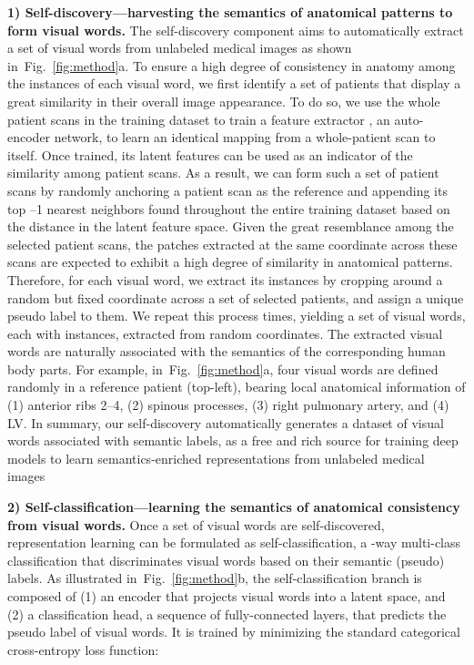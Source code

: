 \documentclass[journal,twoside,web]{ieeecolor}
\def\figurename{Fig.}
\begin{document}
\smallskip
\noindent\textbf{1) Self-discovery---harvesting the semantics of anatomical patterns to form visual words.}
\label{sec:vw_discovery}
The self-discovery component aims to automatically extract a set of  visual words from unlabeled medical images as shown in~\figurename~\ref{fig:method}a. To ensure a high degree of consistency in anatomy among the instances of each visual word, we first identify a set of  patients that display a great similarity in their overall image appearance. To do so, we use the whole patient scans in the training dataset to train a feature extractor , an auto-encoder network, to learn an identical mapping from a whole-patient scan to itself. Once trained, its latent features can be used as an indicator of the similarity among patient scans. As a result, we can form such a set of  patient scans by randomly anchoring a patient scan as the reference and appending its top --1 nearest neighbors found throughout the entire training dataset based on the  distance in the latent feature space. Given the great resemblance among the selected  patient scans, the patches extracted at the same coordinate across these  scans are expected to exhibit a high degree of similarity in anatomical patterns. Therefore, for each visual word, we extract its  instances by cropping around a random but fixed coordinate across a set of selected  patients, and assign a unique pseudo label to them. We repeat this process  times, yielding a set of  visual words, each with  instances, extracted from  random coordinates. The extracted visual words are naturally associated with the semantics of the corresponding human body parts. For example, in~\figurename~\ref{fig:method}a, four visual words are defined randomly in a reference patient  (top-left), bearing local anatomical information of (1) anterior ribs 2--4, (2) spinous processes, (3) right pulmonary artery, and (4) LV.
In summary, our self-discovery automatically generates a dataset of visual words associated with semantic labels, as a free and rich source for training deep models to learn semantics-enriched representations from unlabeled medical images

\medskip
\noindent\textbf{2) Self-classification---learning the semantics of anatomical consistency from visual words.} 
\label{sec:vw_classification}
Once a set of visual words are self-discovered, representation learning can be formulated as self-classification, a -way multi-class classification that discriminates visual words based on their semantic (pseudo) labels.  
As illustrated in~\figurename~\ref{fig:method}b, the self-classification branch is composed of (1) an encoder that projects visual words into a latent space, and (2) a classification head, a sequence of fully-connected layers, that predicts the pseudo label of visual words. 
It is trained by minimizing the standard categorical cross-entropy loss function: 
\end{document}
